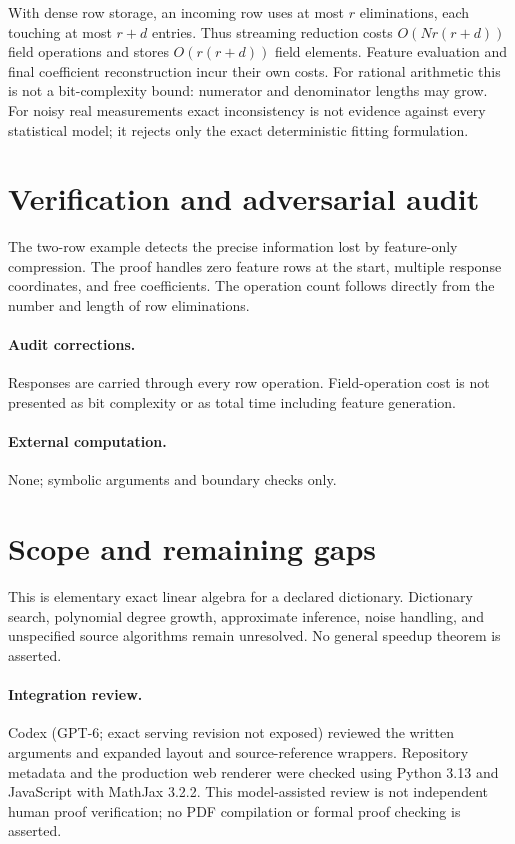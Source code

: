 \documentclass[11pt]{article}
\begin{document}
With dense row storage, an incoming row uses at most $r$ eliminations, each touching at most $r+d$ entries. Thus streaming reduction costs $O(Nr(r+d))$ field operations and stores $O(r(r+d))$ field elements. Feature evaluation and final coefficient reconstruction incur their own costs. For rational arithmetic this is not a bit-complexity bound: numerator and denominator lengths may grow. For noisy real measurements exact inconsistency is not evidence against every statistical model; it rejects only the exact deterministic fitting formulation.
\section{Verification and adversarial audit}
The two-row example detects the precise information lost by feature-only compression. The proof handles zero feature rows at the start, multiple response coordinates, and free coefficients. The operation count follows directly from the number and length of row eliminations.
\paragraph{Audit corrections.} Responses are carried through every row operation. Field-operation cost is not presented as bit complexity or as total time including feature generation.
\paragraph{External computation.} None; symbolic arguments and boundary checks only.
\section{Scope and remaining gaps}
This is elementary exact linear algebra for a declared dictionary. Dictionary search, polynomial degree growth, approximate inference, noise handling, and unspecified source algorithms remain unresolved. No general speedup theorem is asserted.
\paragraph{Integration review.} Codex (GPT-6; exact serving revision not exposed) reviewed the written arguments and expanded layout and source-reference wrappers. Repository metadata and the production web renderer were checked using Python 3.13 and JavaScript with MathJax 3.2.2. This model-assisted review is not independent human proof verification; no PDF compilation or formal proof checking is asserted.
\end{document}
